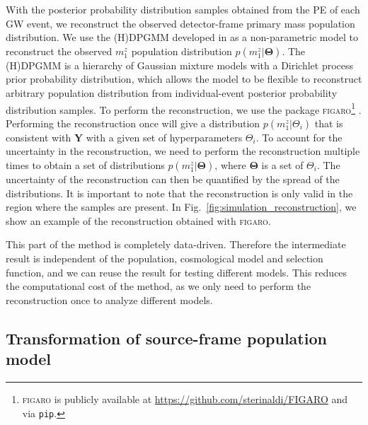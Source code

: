 \documentclass[twocolumn]{aastex631}
\begin{document}
With the posterior probability distribution samples obtained from the \ac{PE} of each \ac{GW} event, we reconstruct the observed detector-frame primary mass population distribution.
We use the \ac{(H)DPGMM} developed in \citet{Rinaldi:2021bhm} as a non-parametric model to reconstruct the observed $m^z_1$ population distribution $p(m^z_1|\mathbf{\Theta})$.
The \ac{(H)DPGMM} is a hierarchy of Gaussian mixture models with a Dirichlet process prior probability distribution, which allows the model to be flexible to reconstruct arbitrary population distribution from individual-event posterior probability distribution samples.
To perform the reconstruction, we use the package \textsc{figaro}\footnote{\textsc{figaro} is publicly available at \url{https://github.com/sterinaldi/FIGARO} and via \texttt{pip}.} \citep{Rinaldi:2024eep}.
Performing the reconstruction once will give a distribution $p(m^z_1|\Theta_i)$ that is consistent with $\mathbf{Y}$ with a given set of hyperparameters $\Theta_i$.
To account for the uncertainty in the reconstruction, we need to perform the reconstruction multiple times to obtain a set of distributions $p(m^z_1|\mathbf{\Theta})$, where $\mathbf{\Theta}$ is a set of $\Theta_i$.
The uncertainty of the reconstruction can then be quantified by the spread of the distributions.
It is important to note that the reconstruction is only valid in the region where the samples are present.
In Fig.~\ref{fig:simulation_reconstruction}, we show an example of the reconstruction obtained with \textsc{figaro}.

This part of the method is completely data-driven.
Therefore the intermediate result is independent of the population, cosmological model and selection function, and we can reuse the result for testing different models.
This reduces the computational cost of the method, as we only need to perform the reconstruction once to analyze different models.

\subsection{Transformation of source-frame population model}
\label{sec:transformation}
\end{document}
